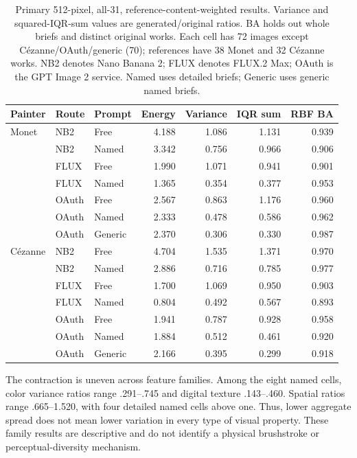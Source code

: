 \documentclass[11pt]{article}
\begin{document}
\begin{table}[ht]
\centering\small
\begin{tabular}{lllrrrr}
\toprule
Painter & Route & Prompt & Energy & Variance & IQR sum & RBF BA\\
\midrule
Monet & NB2 & Free & 4.188 & 1.086 & 1.131 & 0.939\\
 & NB2 & Named & 3.342 & 0.756 & 0.966 & 0.906\\
 & FLUX & Free & 1.990 & 1.071 & 0.941 & 0.901\\
 & FLUX & Named & 1.365 & 0.354 & 0.377 & 0.953\\
 & OAuth & Free & 2.567 & 0.863 & 1.176 & 0.960\\
 & OAuth & Named & 2.333 & 0.478 & 0.586 & 0.962\\
 & OAuth & Generic & 2.370 & 0.306 & 0.330 & 0.987\\
\midrule
Cézanne & NB2 & Free & 4.704 & 1.535 & 1.371 & 0.970\\
 & NB2 & Named & 2.886 & 0.716 & 0.785 & 0.977\\
 & FLUX & Free & 1.700 & 1.069 & 0.950 & 0.903\\
 & FLUX & Named & 0.804 & 0.492 & 0.567 & 0.893\\
 & OAuth & Free & 1.941 & 0.787 & 0.928 & 0.958\\
 & OAuth & Named & 1.884 & 0.512 & 0.461 & 0.920\\
 & OAuth & Generic & 2.166 & 0.395 & 0.299 & 0.918\\
\bottomrule
\end{tabular}
\caption{Primary 512-pixel, all-31, reference-content-weighted results.
Variance and squared-IQR-sum values are generated/original ratios.
BA holds out whole briefs and distinct original works. Each cell has 72 images
except Cézanne/OAuth/generic (70); references have 38 Monet and 32 Cézanne works.
NB2 denotes Nano Banana 2; FLUX denotes FLUX.2 Max; OAuth is the GPT Image 2
service. Named uses detailed briefs; Generic uses generic named briefs.}
\label{tab:primary}
\end{table}

The contraction is uneven across feature families. Among the eight named cells,
color variance ratios range .291--.745 and digital texture .143--.460. Spatial
ratios range .665--1.520, with four detailed named cells above one. Thus, lower
aggregate spread does not mean lower variation in every type of visual property.
These family results are descriptive and do not identify a physical brushstroke
or perceptual-diversity mechanism.
\end{document}
